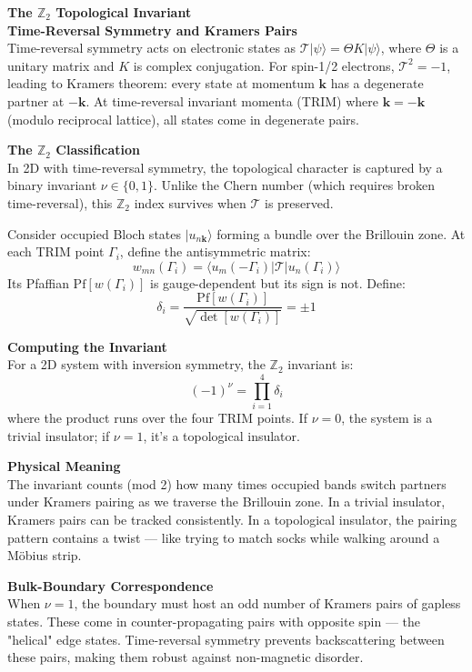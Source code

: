 \begin{technical}
{\Large\textbf{The $\mathbb{Z}_2$ Topological Invariant}}\\[0.3em]

\textbf{Time-Reversal Symmetry and Kramers Pairs}\\[0.5em]
Time-reversal symmetry acts on electronic states as $\mathcal{T}|\psi\rangle = \Theta K|\psi\rangle$, where $\Theta$ is a unitary matrix and $K$ is complex conjugation. For spin-1/2 electrons, $\mathcal{T}^2 = -1$, leading to Kramers theorem: every state at momentum $\mathbf{k}$ has a degenerate partner at $-\mathbf{k}$. At time-reversal invariant momenta (TRIM) where $\mathbf{k} = -\mathbf{k}$ (modulo reciprocal lattice), all states come in degenerate pairs.

\textbf{The $\mathbb{Z}_2$ Classification}\\[0.5em]
In 2D with time-reversal symmetry, the topological character is captured by a binary invariant $\nu \in \{0,1\}$. Unlike the Chern number (which requires broken time-reversal), this $\mathbb{Z}_2$ index survives when $\mathcal{T}$ is preserved.

Consider occupied Bloch states $|u_{n\mathbf{k}}\rangle$ forming a bundle over the Brillouin zone. At each TRIM point $\Gamma_i$, define the antisymmetric matrix:
\[
w_{mn}(\Gamma_i) = \langle u_m(-\Gamma_i)|\mathcal{T}|u_n(\Gamma_i)\rangle
\]
Its Pfaffian $\text{Pf}[w(\Gamma_i)]$ is gauge-dependent but its sign is not. Define:
\[
\delta_i = \frac{\text{Pf}[w(\Gamma_i)]}{\sqrt{\det[w(\Gamma_i)]}} = \pm 1
\]

\textbf{Computing the Invariant}\\[0.5em]
For a 2D system with inversion symmetry, the $\mathbb{Z}_2$ invariant is:
\[
(-1)^\nu = \prod_{i=1}^4 \delta_i
\]
where the product runs over the four TRIM points. If $\nu = 0$, the system is a trivial insulator; if $\nu = 1$, it's a topological insulator.

\columnbreak

\textbf{Physical Meaning}\\[0.5em]
The invariant counts (mod 2) how many times occupied bands switch partners under Kramers pairing as we traverse the Brillouin zone. In a trivial insulator, Kramers pairs can be tracked consistently. In a topological insulator, the pairing pattern contains a twist — like trying to match socks while walking around a Möbius strip.

\textbf{Bulk-Boundary Correspondence}\\[0.5em]
When $\nu = 1$, the boundary must host an odd number of Kramers pairs of gapless states. These come in counter-propagating pairs with opposite spin — the "helical" edge states. Time-reversal symmetry prevents backscattering between these pairs, making them robust against non-magnetic disorder.


\end{technical}
